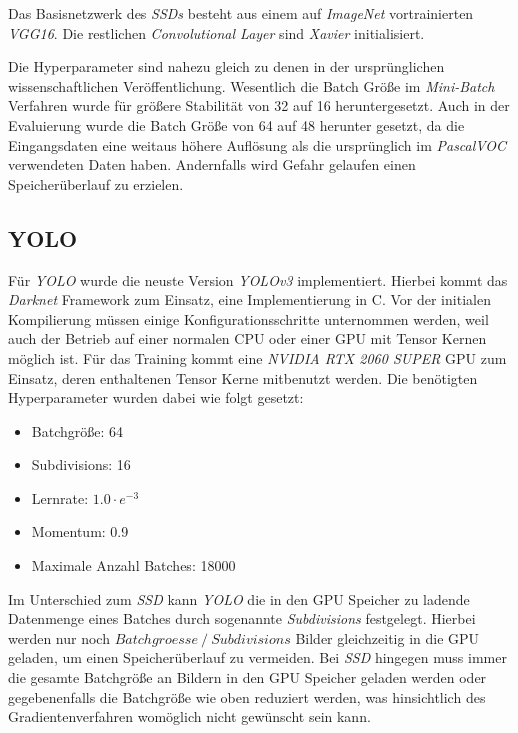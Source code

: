 Das Basisnetzwerk des \textit{SSDs} besteht aus einem auf \textit{ImageNet} vortrainierten \textit{VGG16}. Die restlichen \textit{Convolutional Layer} sind \textit{Xavier} initialisiert. 

Die Hyperparameter sind nahezu gleich zu denen in der ursprünglichen wissenschaftlichen Veröffentlichung. Wesentlich die Batch Größe im \textit{Mini-Batch} Verfahren wurde für größere Stabilität von 32 auf 16 heruntergesetzt. Auch in der Evaluierung wurde die Batch Größe von 64 auf 48 herunter gesetzt, da die Eingangsdaten eine weitaus höhere Auflösung als die ursprünglich im \textit{PascalVOC} verwendeten Daten haben. Andernfalls wird Gefahr gelaufen einen Speicherüberlauf zu erzielen. 

\subsection*{YOLO}

Für \textit{YOLO} wurde die neuste Version \textit{YOLOv3} implementiert. Hierbei kommt das \textit{Darknet} Framework zum Einsatz, eine Implementierung in C. Vor der initialen Kompilierung müssen einige Konfigurationsschritte unternommen werden, weil auch der Betrieb auf einer normalen CPU oder einer GPU mit Tensor Kernen möglich ist. Für das Training kommt eine \textit{NVIDIA RTX 2060 SUPER} GPU zum Einsatz, deren enthaltenen Tensor Kerne mitbenutzt werden. Die benötigten Hyperparameter wurden dabei wie folgt gesetzt:

\begin{itemize}
	\item Batchgröße: 64
	\item Subdivisions: 16
	\item Lernrate: $1.0\cdot e^{-3}$
	\item Momentum: 0.9
	\item Maximale Anzahl Batches: 18000
\end{itemize}

Im Unterschied zum \textit{SSD} kann \textit{YOLO} die in den GPU Speicher zu ladende Datenmenge eines Batches durch sogenannte \textit{Subdivisions} festgelegt. Hierbei werden nur noch \(Batchgroesse \mathbin{/} Subdivisions\) Bilder gleichzeitig in die GPU geladen, um einen Speicherüberlauf zu vermeiden. Bei \textit{SSD} hingegen muss immer die gesamte Batchgröße an Bildern in den GPU Speicher geladen werden oder gegebenenfalls die Batchgröße wie oben reduziert werden, was hinsichtlich des Gradientenverfahren womöglich nicht gewünscht sein kann.

